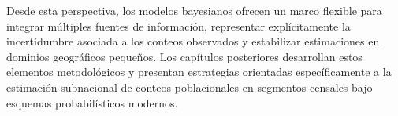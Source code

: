 \documentclass[
  spanish,
]{book}
\begin{document}
Desde esta perspectiva, los modelos bayesianos ofrecen un marco flexible para integrar múltiples fuentes de información, representar explícitamente la incertidumbre asociada a los conteos observados y estabilizar estimaciones en dominios geográficos pequeños. Los capítulos posteriores desarrollan estos elementos metodológicos y presentan estrategias orientadas específicamente a la estimación subnacional de conteos poblacionales en segmentos censales bajo esquemas probabilísticos modernos.


\end{document}
